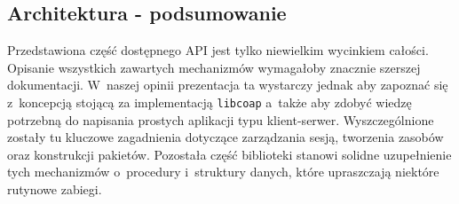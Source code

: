 \vspace{0.5cm}

\vspace{0.5cm}



\subsection{Architektura - podsumowanie}

Przedstawiona część dostępnego API jest tylko niewielkim wycinkiem całości. Opisanie wszystkich zawartych mechanizmów wymagałoby znacznie szerszej dokumentacji. W~naszej opinii prezentacja ta wystarczy jednak aby zapoznać się z~koncepcją stojącą za implementacją \verb|libcoap| a~także aby zdobyć wiedzę potrzebną do napisania prostych aplikacji typu klient-serwer. Wyszczególnione zostały tu kluczowe zagadnienia dotyczące zarządzania sesją, tworzenia zasobów oraz konstrukcji pakietów. Pozostała część biblioteki stanowi solidne uzupełnienie tych mechanizmów o~procedury i~struktury danych, które upraszczają niektóre rutynowe zabiegi.